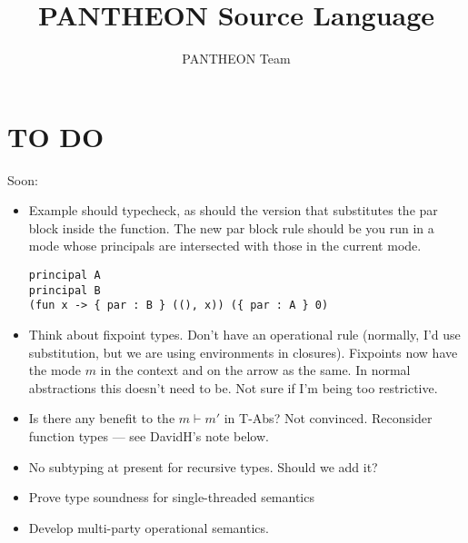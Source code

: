 \documentclass[10pt]{article}
\title{PANTHEON Source Language}
\author{PANTHEON Team}
\begin{document}
\maketitle

\section{TO DO}

Soon:
\begin{itemize}
\item Example should typecheck, as should the version that substitutes the
par block inside the function. The new par block rule should be you
run in a mode whose principals are intersected with those in the current
mode.
\begin{verbatim}
principal A
principal B
(fun x -> { par : B } ((), x)) ({ par : A } 0)
\end{verbatim}
\item Think about fixpoint types. Don't have an operational rule
  (normally, I'd use substitution, but we are using environments in
  closures). Fixpoints now have the mode $m$ in the context and on the
  arrow as the same. In normal abstractions this doesn't need to
  be. Not sure if I'm being too restrictive.
\item Is there any benefit to the $m \vdash m'$ in T-Abs? Not
  convinced. Reconsider function types --- see DavidH's note below.
\item No subtyping at present for recursive types. Should we add
  it?
\item Prove type soundness for single-threaded semantics
\item Develop multi-party operational semantics.
\end{itemize}

\end{document}
